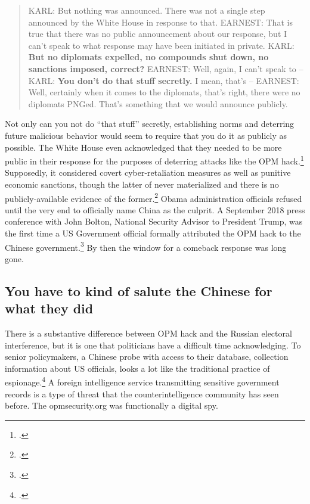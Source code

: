 \documentclass{memoir}
\begin{document}
\begin{refsegment}
\begin{quote}
KARL: But nothing was announced. There was not a single step announced by the White House in response to that.
\newline \newline
EARNEST: That is true that there was no public announcement about our response, but I can't speak to what response may have been initiated in private.
\newline \newline
KARL: \textbf{But no diplomats expelled, no compounds shut down, no sanctions imposed, correct?}
\newline \newline
EARNEST: Well, again, I can't speak to --
\newline \newline
KARL: \textbf{You don't do that stuff secretly.}  I mean, that's --
\newline \newline
EARNEST: Well, certainly when it comes to the diplomats, that's right, there were no diplomats PNGed. That's something that we would announce publicly.
\end{quote}
Not only can you not do ``that stuff'' secretly, establishing norms and deterring future malicious behavior would seem to require that you do it as publicly as possible. The White House even acknowledged that they needed to be more public in their response for the purposes of deterring attacks like the OPM hack.\footcite{sanger_u.s._2016} Supposedly, it considered covert cyber-retaliation measures as well as punitive economic sanctions, though the latter of never materialized and there is no publicly-available evidence of the former.\footcite{nakashima_hacks_2015} Obama administration officials refused until the very end to officially name China as the culprit. A September 2018 press conference with John Bolton, National Security Advisor to President Trump, was the first time a US Government official formally attributed the OPM hack to the Chinese government.\footcite{sanger_trump_2018} By then the window for a comeback response was long gone.

\subsection{You have to kind of salute the Chinese for what they did}
There is a substantive difference between OPM hack and the Russian electoral interference, but it is one that politicians have a difficult time acknowledging. To senior policymakers, a Chinese probe with access to their database, collection information about US officials, looks a lot like the traditional practice of espionage.\footcite{nakashima_chinese_2015} A foreign intelligence service transmitting sensitive government records is a type of threat that the counterintelligence community has seen before. The opmsecurity.org was functionally a digital spy.


\end{refsegment}
\end{document}
